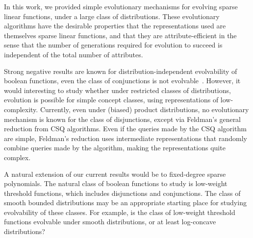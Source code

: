 In this work, we provided simple evolutionary mechanisms for evolving sparse
linear functions, under a large class of distributions. These evolutionary
algorithms have the desirable properties that the representations used are
themselves sparse linear functions, and that they are attribute-efficient in the
sense that the number of generations required for evolution to succeed is
independent of the total number of attributes.

Strong negative results are known for distribution-independent evolvability of
boolean functions, \eg even the class of conjunctions is not
evolvable~\cite{Feldman:2011-LTF}. However, it would interesting to study
whether under restricted classes of distributions, evolution is possible for
simple concept classes, using representations of low-complexity. Currently, even
under (biased) product distributions, no evolutionary mechanism is known for the
class of disjunctions, except via Feldman's general reduction from CSQ
algorithms. Even if the queries made by the CSQ algorithm are simple, Feldman's
reduction uses intermediate representations that randomly combine queries made
by the algorithm, making the representations quite complex.

A natural extension of our current results would be to fixed-degree sparse
polynomials. The natural class of boolean functions to study is low-weight
threshold functions, which includes disjunctions and conjunctions. The class of
smooth bounded distributions may be an appropriate starting place for studying
evolvability of these classes. For example, is the class of low-weight threshold
functions evolvable under smooth distributions, or at least log-concave
distributions? 
